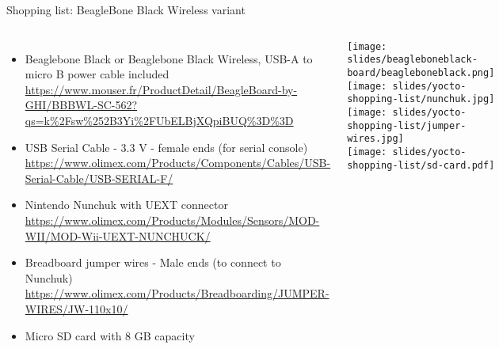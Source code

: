 \begin{frame}[fragile]{Shopping list: BeagleBone Black Wireless variant}
  \begin{columns}
    \begin{itemize}
    \item Beaglebone Black or Beaglebone Black Wireless, USB-A to
      micro B power cable included
      {\fontsize{6}{6}\selectfont
        \url{https://www.mouser.fr/ProductDetail/BeagleBoard-by-GHI/BBBWL-SC-562?qs=k%2Fsw%252B3Yi%2FUbELBjXQpiBUQ%3D%3D}
      }
    \item USB Serial Cable - 3.3 V - female ends (for serial console)
      {\fontsize{6}{6}\selectfont
        \url{https://www.olimex.com/Products/Components/Cables/USB-Serial-Cable/USB-SERIAL-F/}
      }
    \item Nintendo Nunchuk with UEXT connector
      {\fontsize{6}{6}\selectfont
        \url{https://www.olimex.com/Products/Modules/Sensors/MOD-WII/MOD-Wii-UEXT-NUNCHUCK/}
      }
    \item Breadboard jumper wires - Male ends (to connect to Nunchuk)
      {\fontsize{6}{6}\selectfont
        \url{https://www.olimex.com/Products/Breadboarding/JUMPER-WIRES/JW-110x10/}
      }
    \item Micro SD card with 8 GB capacity
    \end{itemize}
    \begin{center}
      \texttt{[image: slides/beagleboneblack-board/beagleboneblack.png]} \\
      \texttt{[image: slides/yocto-shopping-list/nunchuk.jpg]} \\
      \texttt{[image: slides/yocto-shopping-list/jumper-wires.jpg]} \\
      \texttt{[image: slides/yocto-shopping-list/sd-card.pdf]}
    \end{center}
  \end{columns}
\end{frame}

